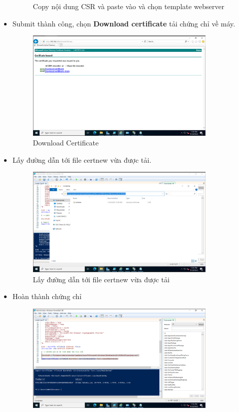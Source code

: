 \documentclass[13pt]{report}
\begin{document}
\begin{itemize}
\begin{figure}[htp]
			\caption{Copy nội dung CSR và paste vào và chọn template webserver}
		\end{figure}
		\newpage
		\item Submit thành công, chọn \textbf{Download certificate} tải chứng chỉ về máy. 
		\begin{figure}[htp]
			\centering
			\includegraphics[width=0.85\textwidth]{image/PowerShell/ADCS/10.png}
			\caption{Download Certificate}
		\end{figure}
		\item Lấy đường dẫn tới file certnew vừa được tải.
		\begin{figure}[htp]
			\centering
			\includegraphics[width=0.85\textwidth]{image/PowerShell/ADCS/11.png}
			\caption{Lấy đường dẫn tới file certnew vừa được tải}
		\end{figure}
		\newpage
		\item Hoàn thành chứng chỉ
		\begin{figure}[htp]
			\centering
			\includegraphics[width=0.85\textwidth]{image/PowerShell/ADCS/12.png}

\end{figure}
\end{itemize}
\end{document}
